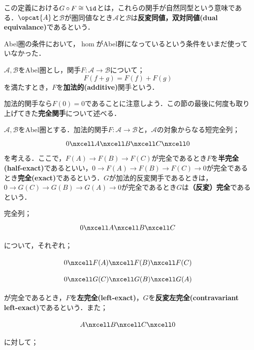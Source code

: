 この定義における$G\circ F\cong\id$とは，これらの関手が自然同型という意味である．$\opcat{A}$と$\mathscr{B}$が圏同値なとき$\mathscr{A}$と$\mathscr{B}$は\textbf{反変同値，双対同値(dual equivalance)}であるという．

Abel圏の条件において，$\hom$がAbel群になっているという条件をいまだ使っていなかった．
\begin{defi}[加法的関手]
	$\mathscr{A}, \mathscr{B}$をAbel圏とし，関手$F:\mathscr{A}\to\mathscr{B}$について；
	\[F(f+g)=F(f)+F(g)\]
	を満たすとき，$F$を\textbf{加法的(additive)}関手という．
\end{defi}

加法的関手なら$F(0)=0$であることに注意しよう．この節の最後に何度も取り上げてきた\textbf{完全関手}について述べる．

\begin{defi}[完全関手]
	$\mathscr{A},\mathscr{B}$をAbel圏とする．加法的関手$F:\mathscr{A}\to\mathscr{B}$と，$\mathscr{A}$の対象からなる短完全列；
	\[\begin{tikzcd}
	0\nxcell A\nxcell B\nxcell C\nxcell 0
	\end{tikzcd}\]
	を考える．ここで，$F(A)\to F(B)\to F(C)$が完全であるとき$F$を\textbf{半完全(half-exact)}であるといい，$0\to F(A)\to F(B)\to F(C)\to 0$が完全であるとき\textbf{完全(exact)}であるという．$G$が加法的反変関手であるときは，$0\to G(C)\to G(B)\to G(A)\to0$が完全であるとき$G$は\textbf{（反変）完全}であるという．
\end{defi}

完全列；
\[\begin{tikzcd}
0\nxcell A\nxcell B\nxcell C 
\end{tikzcd}\]

について，それぞれ；

\[\begin{tikzcd}
0\nxcell F(A)\nxcell F(B)\nxcell F(C)
\end{tikzcd}\]
\[\begin{tikzcd}
0\nxcell G(C)\nxcell G(B)\nxcell G(A)
\end{tikzcd}\]

が完全であるとき，$F$を\textbf{左完全(left-exact)}，$G$を\textbf{反変左完全(contravariant left-exact)}であるという．また；

\[\begin{tikzcd}
A\nxcell B\nxcell C\nxcell0
\end{tikzcd}\]

に対して；

